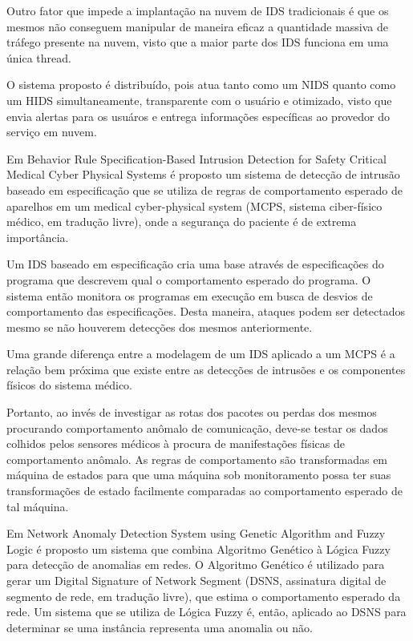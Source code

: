 \documentclass[openright]{normas-utf-tex} %
\begin{document}
	Outro fator que impede a implantação na nuvem de IDS tradicionais é que os mesmos não conseguem manipular de maneira eficaz a quantidade massiva de tráfego presente na nuvem, visto que a maior parte dos IDS funciona em uma única thread.
	
	O sistema proposto é distribuído, pois atua tanto como um NIDS quanto como um HIDS simultaneamente, transparente com o usuário e otimizado, visto que envia alertas para os usuáros e entrega informações específicas ao provedor do serviço em nuvem.
	
	Em Behavior Rule Specification-Based Intrusion Detection for Safety Critical Medical Cyber Physical Systems \cite{medical} é proposto um sistema de detecção de intrusão baseado em especificação que se utiliza de regras de comportamento esperado de aparelhos em um medical cyber-physical system (MCPS, sistema ciber-físico médico, em tradução livre), onde a segurança do paciente é de extrema importância. 
	
	Um IDS baseado em especificação cria uma base através de especificações do programa que descrevem qual o comportamento esperado do programa. O sistema então monitora os programas em execução em busca de desvios de comportamento das especificações. Desta maneira, ataques podem ser detectados mesmo se não houverem detecções dos mesmos anteriormente.
	
	Uma grande diferença entre a modelagem de um IDS aplicado a um MCPS é a relação bem próxima que existe entre as detecções de intrusões e os componentes físicos do sistema médico.
	
	Portanto, ao invés de investigar as rotas dos pacotes ou perdas dos mesmos procurando comportamento anômalo de comunicação, deve-se testar os dados colhidos pelos sensores médicos à procura de manifestações físicas de comportamento anômalo. As regras de comportamento são transformadas em máquina de estados para que uma máquina sob monitoramento possa ter suas transformações de estado facilmente comparadas ao comportamento esperado de tal máquina.	
	
	Em Network Anomaly Detection System using Genetic
Algorithm and Fuzzy Logic \cite{fuzzy} é proposto um sistema que combina Algoritmo Genético à Lógica Fuzzy para detecção de anomalias em redes. O Algoritmo Genético é utilizado para gerar um Digital Signature of Network Segment (DSNS, assinatura digital de segmento de rede, em tradução livre), que estima o comportamento esperado da rede. Um sistema que se utiliza de Lógica Fuzzy é, então, aplicado ao DSNS para determinar se uma instância representa uma anomalia ou não.
	
\end{document}
